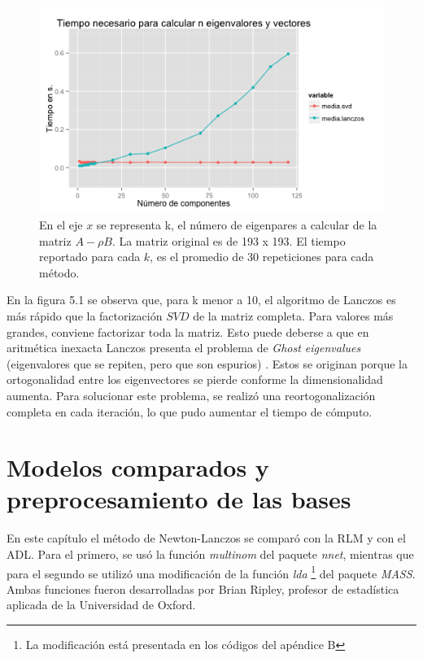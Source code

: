 \begin{figure}[!ht]
  \centering
  \includegraphics[width=1\textwidth]{Figures/Chapter4_eigen_lanczos.png} 
  \caption[Desempeño de Lanczos]
  {En el eje $x$ se representa k, el número de eigenpares a calcular de la matriz $A- \rho B$. La matriz original es de 193 x 193. El tiempo reportado para cada $k$, es el promedio de $30$ repeticiones para cada método.}
\end{figure}

En la figura 5.1 se observa que, para k menor a 10, el algoritmo de Lanczos es más rápido que la factorización $SVD$ de la matriz completa. Para valores más grandes, conviene factorizar toda la matriz. Esto puede deberse a que en aritmética inexacta Lanczos presenta el problema de \textit{Ghost eigenvalues} (eigenvalores que se repiten, pero que son espurios) \cite{golub2012matrix}. Estos se originan porque la ortogonalidad entre los eigenvectores se pierde conforme la dimensionalidad aumenta. Para solucionar este problema, se realizó una reortogonalización completa en cada iteración, lo que pudo aumentar el tiempo de cómputo. 

\section{Modelos comparados y preprocesamiento de las bases}

En este capítulo el método de Newton-Lanczos se comparó con la RLM y con el ADL. Para el primero, se usó la función \textit{multinom} del paquete \textit{nnet}, mientras que para el segundo se utilizó una modificación de la función \textit{lda} \footnote{La modificación está presentada en los códigos del apéndice B} del paquete \textit{MASS}. Ambas funciones fueron desarrolladas por Brian Ripley, profesor de estadística aplicada de la Universidad de Oxford. 

